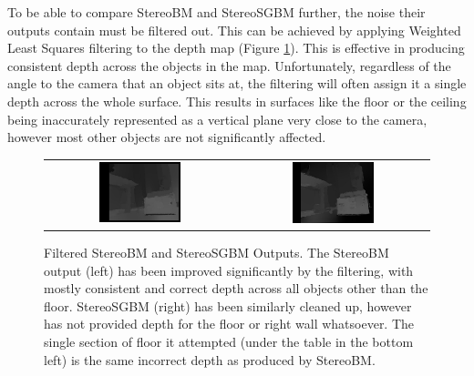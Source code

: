 To be able to compare StereoBM and StereoSGBM further, the noise their outputs contain must be filtered out. This can be achieved by applying Weighted Least Squares filtering to the depth map (Figure \ref{fig:filtered}). This is effective in producing consistent depth across the objects in the map. Unfortunately, regardless of the angle to the camera that an object sits at, the filtering will often assign it a single depth across the whole surface. This results in surfaces like the floor or the ceiling being inaccurately represented as a vertical plane very close to the camera, however most other objects are not significantly affected.


\begin{figure}[H]
    \begin{center}
      \begin{tabular}{ c c }
        \includegraphics[width=0.45\textwidth]{Figures/BMfiltered.jpg} &
        \includegraphics[width=0.45\textwidth]{Figures/sgbmfilt.jpg}
      \end{tabular}
      \caption[Filtered StereoBM and StereoSGBM Outputs]{Filtered StereoBM and StereoSGBM Outputs. The StereoBM output (left) has been improved significantly by the filtering, with mostly consistent and correct depth across all objects other than the floor. StereoSGBM (right) has been similarly cleaned up, however has not provided depth for the floor or right wall whatsoever. The single section of floor it attempted (under the table in the bottom left) is the same incorrect depth as produced by StereoBM.}
      \label{fig:filtered}
    \end{center}
\end{figure}

